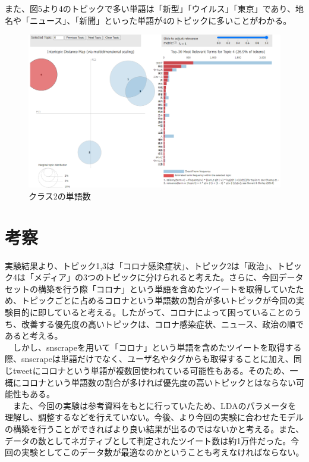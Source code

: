 \documentclass[a4paper, 11pt, titlepage]{jsarticle}
\begin{document}
また、図5より4のトピックで多い単語は「新型」「ウイルス」「東京」であり、地名や「ニュース」、「新聞」といった単語が4のトピックに多いことがわかる。\\
\begin{figure}[H]
  \centering
  \includegraphics[scale=0.25]{picture5.png}
  \caption{クラス2の単語数}
\end{figure}

\section{考察}
実験結果より、トピック1,3は「コロナ感染症状」、トピック2は「政治」、トピック4は「メディア」の3つのトピックに分けられると考えた。さらに、今回データセットの構築を行う際「コロナ」という単語を含めたツイートを取得していたため、トピックごとに占めるコロナという単語数の割合が多いトピックが今回の実験目的に即していると考える。したがって、コロナによって困っていることのうち、改善する優先度の高いトピックは、コロナ感染症状、ニュース、政治の順であると考える。\\
　しかし、snscrapeを用いて「コロナ」という単語を含めたツイートを取得する際、snscrapeは単語だけでなく、ユーザ名やタグからも取得することに加え、同じtweetにコロナという単語が複数回使われている可能性もある。そのため、一概にコロナという単語数の割合が多ければ優先度の高いトピックとはならない可能性もある。\\
　また、今回の実験は参考資料をもとに行っていたため、LDAのパラメータを理解し、調整するなどを行えていない。今後、より今回の実験に合わせたモデルの構築を行うことができればより良い結果が出るのではないかと考える。また、データの数としてネガティブとして判定されたツイート数は約1万件だった。今回の実験としてこのデータ数が最適なのかということも考えなければならない。
\end{document}
